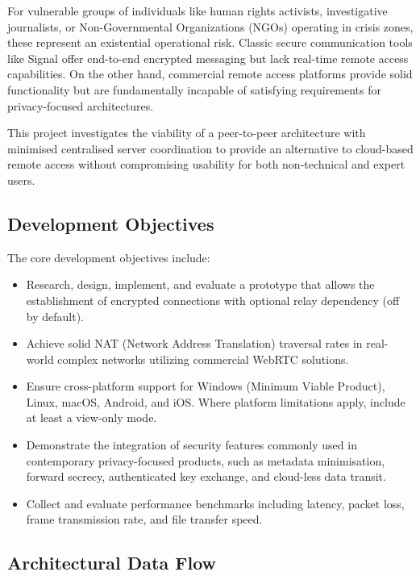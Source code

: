 \documentclass[12pt,a4paper]{article}
\begin{document}
For vulnerable groups of individuals like human rights activists, investigative journalists, or Non-Governmental Organizations (NGOs) operating in crisis zones, these represent an existential operational risk. Classic secure communication tools like Signal offer end-to-end encrypted messaging but lack real-time remote access capabilities. On the other hand, commercial remote access platforms provide solid functionality but are fundamentally incapable of satisfying requirements for privacy-focused architectures.

This project investigates the viability of a peer-to-peer architecture with minimised centralised server coordination to provide an alternative to cloud-based remote access without compromising usability for both non-technical and expert users.

\subsection{Development Objectives}

The core development objectives include:

\begin{itemize} \itemsep0pt
    \item Research, design, implement, and evaluate a prototype that allows the establishment of encrypted connections with optional relay dependency (off by default).
    \item Achieve solid NAT (Network Address Translation) traversal rates in real-world complex networks utilizing commercial WebRTC solutions.
    \item Ensure cross-platform support for Windows (Minimum Viable Product), Linux, macOS, Android, and iOS. Where platform limitations apply, include at least a view-only mode.
    \item Demonstrate the integration of security features commonly used in contemporary privacy-focused products, such as metadata minimisation, forward secrecy, authenticated key exchange, and cloud-less data transit.
    \item Collect and evaluate performance benchmarks including latency, packet loss, frame transmission rate, and file transfer speed.
\end{itemize}

\subsection{Architectural Data Flow}
\end{document}

